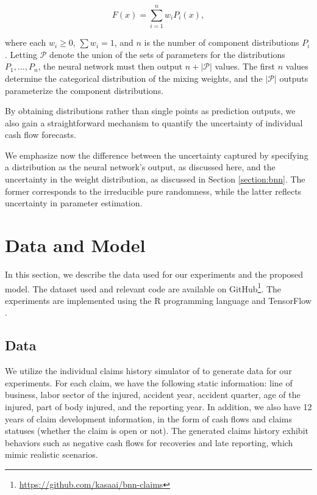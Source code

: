 \documentclass{article}
\begin{document}
\begin{equation}
    F(x) = \sum_{i = 1}^n w_i P_i(x),
\end{equation}

where each $w_i \geq 0$, $\sum w_i = 1$, and $n$ is the number of component 
distributions $P_i$. Letting $\mathcal{P}$ denote the union of the sets of 
parameters for the distributions $P_1, \dots, P_n$, the neural network must then
output $n + |\mathcal{P}|$ values. The first $n$ values determine the 
categorical distribution of the mixing weights, and the $|\mathcal{P}|$ outputs
parameterize the component distributions.

By obtaining distributions rather than single points as prediction outputs, we
also gain a straightforward mechanism to quantify the uncertainty of individual
cash flow forecasts.

We emphasize now the difference between the uncertainty captured by specifying a
distribution as the neural network's output, as discussed here, and the 
uncertainty in the weight distribution, as discussed in Section 
\ref{section:bnn}. The former corresponds to the irreducible pure randomness,
while the latter reflects uncertainty in parameter estimation.

\section{Data and Model}

In this section, we describe the data used for our experiments and the proposed
model. The dataset used and relevant code are available on 
GitHub\footnote{\url{https://github.com/kasaai/bnn-claims}}. The experiments are
implemented using the R programming language 
\cite{rdevelopmentcoreteamLanguageEnvironment2011} and TensorFlow 
\cite{abadiTensorflowSystem2016}.

\subsection{Data}

We utilize the individual claims history simulator of 
\cite{gabrielliIndividualClaims2018} to generate data for our experiments. For 
each claim, we have the following static information: line of business, labor 
sector of the injured, accident year, accident quarter, age of the injured, part
of body injured, and the reporting year. In addition, we also have 12 years of 
claim development information, in the form of cash flows and claims statuses 
(whether the claim is open or not). The generated claims history exhibit 
behaviors such as negative cash flows for recoveries and late reporting, which 
mimic realistic scenarios.
\end{document}
